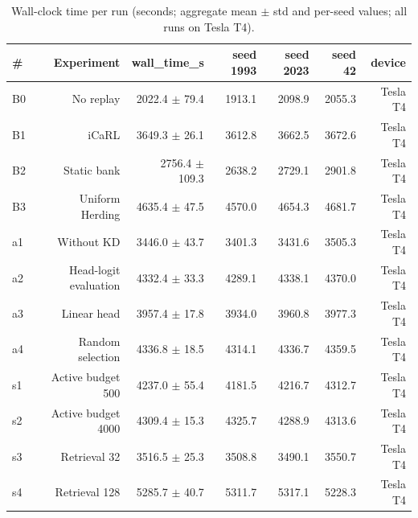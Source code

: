 \documentclass{article}
\begin{document}
\begin{table}[htbp]
  \centering
  \caption{Wall-clock time per run (seconds; aggregate mean $\pm$ std and per-seed values; all runs on Tesla T4).}
  \label{tab:A5_compute_cost}
  \begin{tabular}{lrrrrrr}
    \toprule
    \textbf{\#} & \textbf{Experiment} & \textbf{wall\_time\_s} & \textbf{seed 1993} & \textbf{seed 2023} & \textbf{seed 42} & \textbf{device} \\
    \midrule
    B0 & No replay & 2022.4 $\pm$ 79.4 & 1913.1 & 2098.9 & 2055.3 & Tesla T4 \\
    B1 & iCaRL & 3649.3 $\pm$ 26.1 & 3612.8 & 3662.5 & 3672.6 & Tesla T4 \\
    B2 & Static bank & 2756.4 $\pm$ 109.3 & 2638.2 & 2729.1 & 2901.8 & Tesla T4 \\
    B3 & Uniform Herding & 4635.4 $\pm$ 47.5 & 4570.0 & 4654.3 & 4681.7 & Tesla T4 \\
    a1 & Without KD & 3446.0 $\pm$ 43.7 & 3401.3 & 3431.6 & 3505.3 & Tesla T4 \\
    a2 & Head-logit evaluation & 4332.4 $\pm$ 33.3 & 4289.1 & 4338.1 & 4370.0 & Tesla T4 \\
    a3 & Linear head & 3957.4 $\pm$ 17.8 & 3934.0 & 3960.8 & 3977.3 & Tesla T4 \\
    a4 & Random selection & 4336.8 $\pm$ 18.5 & 4314.1 & 4336.7 & 4359.5 & Tesla T4 \\
    s1 & Active budget 500 & 4237.0 $\pm$ 55.4 & 4181.5 & 4216.7 & 4312.7 & Tesla T4 \\
    s2 & Active budget 4000 & 4309.4 $\pm$ 15.3 & 4325.7 & 4288.9 & 4313.6 & Tesla T4 \\
    s3 & Retrieval 32 & 3516.5 $\pm$ 25.3 & 3508.8 & 3490.1 & 3550.7 & Tesla T4 \\
    s4 & Retrieval 128 & 5285.7 $\pm$ 40.7 & 5311.7 & 5317.1 & 5228.3 & Tesla T4 \\
    \bottomrule
  \end{tabular}
\end{table}
\end{document}
